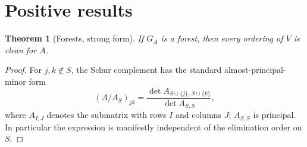 \documentclass[11pt]{article}
\theoremstyle{plain}
\newtheorem{theorem}{Theorem}[section]
\theoremstyle{definition}
\theoremstyle{remark}
\begin{document}
\section{Positive results}\label{sec:positive}

\begin{aiblock}
\begin{theorem}[Forests, strong form]\label{thm:forest}
If $G_A$ is a forest, then every ordering of $V$ is clean for $A$.
\end{theorem}
\begin{proof}
For $j,k\notin S$, the Schur complement has the standard almost-principal-minor form
\[
(A/A_S)_{jk}= \frac{\det A_{S\cup\{j\},\,S\cup\{k\}}}{\det A_{S,S}},
\]
where $A_{I,J}$ denotes the submatrix with rows $I$ and columns $J$; $A_{S,S}$ is principal. In particular the expression is manifestly independent of the elimination order on $S$.


\end{proof}
\end{aiblock}
\end{document}
